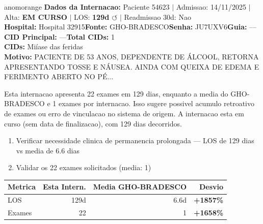 \documentclass[a4paper,10pt]{article}
\begin{document}
\begin{anomalycard}[Internacao 103248 | GHO-BRADESCO | ALTO (z=4.02)]{anomorange}
\textbf{Dados da Internacao:} Paciente 54623 $\mid$ Admissao: 14/11/2025 $\mid$ Alta: \textcolor{anomorange}{\textbf{EM CURSO}} $\mid$ LOS: \textbf{129d \textcolor{anomorange}{$\circlearrowleft$}} $\mid$ Readmissao 30d: Nao\\
\textbf{Hospital:} Hospital 32915\quad\textbf{Fonte:} GHO-BRADESCO\quad\textbf{Senha:} JU7UXV6\quad\textbf{Guia:} ---\\
\textbf{CID Principal:} {\small ---}\quad\textbf{Total CIDs:} 1\\

\textbf{CIDs:} {\scriptsize Miíase das feridas}\\

\textbf{Motivo:} {\scriptsize PACIENTE DE 53 ANOS, DEPENDENTE DE ÁLCOOL, RETORNA APRESENTANDO TOSSE E NÁUSEA. AINDA COM QUEIXA DE EDEMA E FERIMENTO ABERTO NO PÉ...}\\

\vspace{2pt}\begin{tcolorbox}[colback=severityred!20,colframe=anomorange,title={\textbf{Interpretacao de Negocio}},fonttitle=\bfseries\small,left=4pt,right=4pt,top=3pt,bottom=3pt]
{\small Esta internacao apresenta 22 exames em 129 dias, enquanto a media do GHO-BRADESCO e 1 exames por internacao. Isso sugere possivel acumulo retroativo de exames ou erro de vinculacao no sistema de origem. A internacao esta em curso (sem data de finalizacao), com 129 dias decorridos.}
\end{tcolorbox}
\begin{tcolorbox}[colback=severityyellow!30,colframe=anomorange,title={\textbf{Recomendacoes Especificas}},fonttitle=\bfseries\small,left=4pt,right=4pt,top=3pt,bottom=3pt]
\begin{enumerate}[nosep,leftmargin=16pt]
\item {\small Verificar necessidade clinica de permanencia prolongada --- LOS de 129 dias vs media de 6.6 dias}
\item {\small Validar os 22 exames solicitados (media: 1)}
\end{enumerate}
\end{tcolorbox}
\begin{center}\begin{tabular}{l r r r}\toprule\textbf{Metrica} & \textbf{Esta Intern.} & \textbf{Media GHO-BRADESCO} & \textbf{Desvio} \\\midrule
LOS & 129d & 6.6d & \textcolor{anomred}{\textbf{+1857\%}} \\
Exames & 22 & 1 & \textcolor{anomred}{\textbf{+1658\%}} \\
\bottomrule\end{tabular}\end{center}


\end{anomalycard}
\end{document}
